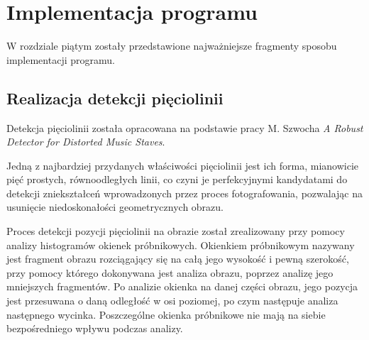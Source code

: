 \chapter{Implementacja programu}
W rozdziale piątym zostały przedstawione najważniejsze fragmenty sposobu implementacji programu. 

\section{Realizacja detekcji pięciolinii}

Detekcja pięciolinii została opracowana na podstawie pracy M. Szwocha \textit{A Robust Detector for Distorted Music Staves}.

Jedną z najbardziej przydanych właściwości pięciolinii jest ich forma, mianowicie pięć prostych, równoodległych linii, co czyni je perfekcyjnymi kandydatami do detekcji zniekształceń wprowadzonych przez proces fotografowania, pozwalając na usunięcie niedoskonałości geometrycznych obrazu.

Proces detekcji pozycji pięciolinii na obrazie został zrealizowany przy pomocy analizy histogramów okienek próbnikowych. Okienkiem próbnikowym nazywany jest fragment obrazu rozciągający się na całą jego wysokość i pewną szerokość, przy pomocy którego dokonywana jest analiza obrazu, poprzez analizę jego mniejszych fragmentów. Po analizie okienka na danej części obrazu, jego pozycja jest przesuwana o daną odległość w osi poziomej, po czym następuje analiza następnego wycinka. Poszczególne okienka próbnikowe nie mają na siebie bezpośredniego wpływu podczas analizy.

